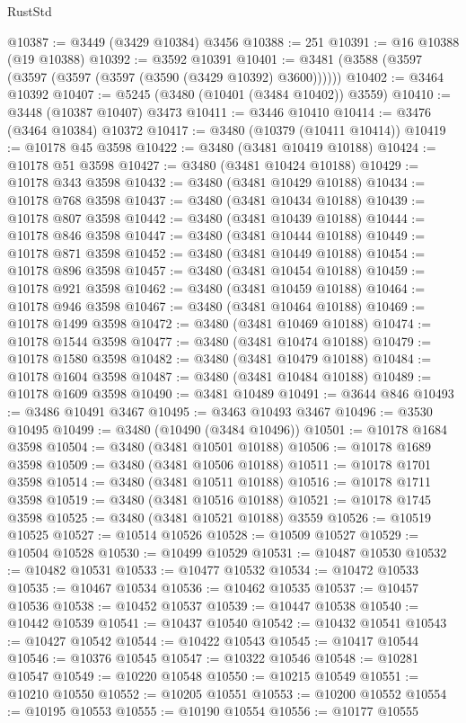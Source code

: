 \begin{lexlean}{RustStd}
\begin{coremodule}
{\begin{coremodule}
{{{{{{{{{{{{{{{{{{{{{{{{{{{{{{{{{{{{{{{{{{{{{{{{{{{{{{{{{{{{{{{{{{{{{{{{{{{{{{{{{{{{{@10387 := @3449 (@3429 @10384) @3456
@10388 := 251
@10391 := @16 @10388 (@19 @10388)
@10392 := @3592 @10391
@10401 := @3481 (@3588 (@3597 (@3597 (@3597 (@3597 (@3590 (@3429 @10392) @3600))))))
@10402 := @3464 @10392
@10407 := @5245 (@3480 (@10401 (@3484 @10402)) @3559)
@10410 := @3448 (@10387 @10407) @3473
@10411 := @3446 @10410
@10414 := @3476 (@3464 @10384) @10372
@10417 := @3480 (@10379 (@10411 @10414))
@10419 := @10178 @45 @3598
@10422 := @3480 (@3481 @10419 @10188)
@10424 := @10178 @51 @3598
@10427 := @3480 (@3481 @10424 @10188)
@10429 := @10178 @343 @3598
@10432 := @3480 (@3481 @10429 @10188)
@10434 := @10178 @768 @3598
@10437 := @3480 (@3481 @10434 @10188)
@10439 := @10178 @807 @3598
@10442 := @3480 (@3481 @10439 @10188)
@10444 := @10178 @846 @3598
@10447 := @3480 (@3481 @10444 @10188)
@10449 := @10178 @871 @3598
@10452 := @3480 (@3481 @10449 @10188)
@10454 := @10178 @896 @3598
@10457 := @3480 (@3481 @10454 @10188)
@10459 := @10178 @921 @3598
@10462 := @3480 (@3481 @10459 @10188)
@10464 := @10178 @946 @3598
@10467 := @3480 (@3481 @10464 @10188)
@10469 := @10178 @1499 @3598
@10472 := @3480 (@3481 @10469 @10188)
@10474 := @10178 @1544 @3598
@10477 := @3480 (@3481 @10474 @10188)
@10479 := @10178 @1580 @3598
@10482 := @3480 (@3481 @10479 @10188)
@10484 := @10178 @1604 @3598
@10487 := @3480 (@3481 @10484 @10188)
@10489 := @10178 @1609 @3598
@10490 := @3481 @10489
@10491 := @3644 @846
@10493 := @3486 @10491 @3467
@10495 := @3463 @10493 @3467
@10496 := @3530 @10495
@10499 := @3480 (@10490 (@3484 @10496))
@10501 := @10178 @1684 @3598
@10504 := @3480 (@3481 @10501 @10188)
@10506 := @10178 @1689 @3598
@10509 := @3480 (@3481 @10506 @10188)
@10511 := @10178 @1701 @3598
@10514 := @3480 (@3481 @10511 @10188)
@10516 := @10178 @1711 @3598
@10519 := @3480 (@3481 @10516 @10188)
@10521 := @10178 @1745 @3598
@10525 := @3480 (@3481 @10521 @10188) @3559
@10526 := @10519 @10525
@10527 := @10514 @10526
@10528 := @10509 @10527
@10529 := @10504 @10528
@10530 := @10499 @10529
@10531 := @10487 @10530
@10532 := @10482 @10531
@10533 := @10477 @10532
@10534 := @10472 @10533
@10535 := @10467 @10534
@10536 := @10462 @10535
@10537 := @10457 @10536
@10538 := @10452 @10537
@10539 := @10447 @10538
@10540 := @10442 @10539
@10541 := @10437 @10540
@10542 := @10432 @10541
@10543 := @10427 @10542
@10544 := @10422 @10543
@10545 := @10417 @10544
@10546 := @10376 @10545
@10547 := @10322 @10546
@10548 := @10281 @10547
@10549 := @10220 @10548
@10550 := @10215 @10549
@10551 := @10210 @10550
@10552 := @10205 @10551
@10553 := @10200 @10552
@10554 := @10195 @10553
@10555 := @10190 @10554
@10556 := @10177 @10555
}}}}}}}}}}}}}}}}}}}}}}}}}}}}}}}}}}}}}}}}}}}}}}}}}}}}}}}}}}}}}}}}}}}}}}}}}}}}}}}}}}}}}
\end{coremodule}}
\end{coremodule}
\end{lexlean}
